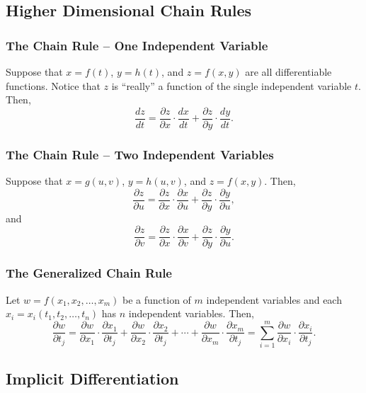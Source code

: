 \subsection{Higher Dimensional Chain Rules}

\subsubsection{The Chain Rule – One Independent Variable}

Suppose that \(x = f(t)\), \(y = h(t)\), and \(z = f(x, y)\) are all differentiable functions. Notice that \(z\) is “really” a function of the single independent variable \(t\). Then,
\[
\dfrac{dz}{dt} = \dfrac{\partial z}{\partial x} \cdot \dfrac{dx}{dt} + \dfrac{\partial z}{\partial y} \cdot \dfrac{dy}{dt}.
\]
\subsubsection{The Chain Rule – Two Independent Variables}

Suppose that \(x = g(u, v)\), \(y = h(u, v)\), and \(z = f(x, y)\). Then,
\[
\dfrac{\partial z}{\partial u} = \dfrac{\partial z}{\partial x} \cdot \dfrac{\partial x}{\partial u} + \dfrac{\partial z}{\partial y} \cdot \dfrac{\partial y}{\partial u},
\]
and
\[
\dfrac{\partial z}{\partial v} = \dfrac{\partial z}{\partial x} \cdot \dfrac{\partial x}{\partial v} + \dfrac{\partial z}{\partial y} \cdot \dfrac{\partial y}{\partial u}.
\]
\subsubsection{The Generalized Chain Rule}

Let \(w = f(x_{1}, x_{2}, \ldots, x_{m})\) be a function of \(m\) independent variables and each \(x_{i} = x_{i}(t_{1}, t_{2}, \ldots, t_{n})\) has \(n\) independent variables. Then,
\[
\dfrac{\partial w}{\partial t_{j}} = \dfrac{\partial w}{\partial x_{1}} \cdot \dfrac{\partial x_{1}}{\partial t_{j}} + \dfrac{\partial w}{\partial x_{2}} \cdot \dfrac{\partial x_{2}}{\partial t_{j}} + \cdots + \dfrac{\partial w}{\partial x_{m}} \cdot \dfrac{\partial x_{m}}{\partial t_{j}} = \sum_{i=1}^{m} \dfrac{\partial w}{\partial x_{i}} \cdot \dfrac{\partial x_{i}}{\partial t_{j}}.
\]

\subsection{Implicit Differentiation}

